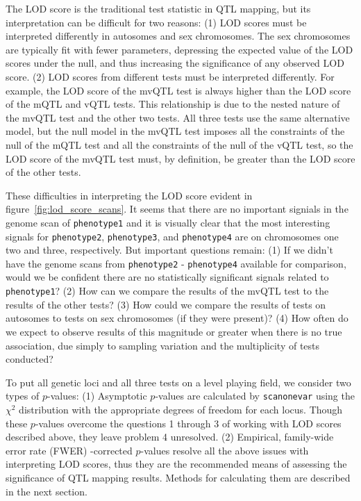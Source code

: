 \documentclass[9pt,twocolumn,twoside]{gsag3jnl}
\begin{document}
The LOD score is the traditional test statistic in QTL mapping, but its interpretation can be difficult for two reasons:
(1) LOD scores must be interpreted differently in autosomes and sex chromosomes.
The sex chromosomes are typically fit with fewer parameters, depressing the expected value of the LOD scores under the null, and thus increasing the significance of any observed LOD score.
(2) LOD scores from different tests must be interpreted differently.
For example, the LOD score of the mvQTL test is always higher than the LOD score of the mQTL and vQTL tests.
This relationship is due to the nested nature of the mvQTL test and the other two tests.
All three tests use the same alternative model, but the null model in the mvQTL test imposes all the constraints of the null of the mQTL test and all the constraints of the null of the vQTL test, so the LOD score of the mvQTL test must, by definition, be greater than the LOD score of the other tests.

These difficulties in interpreting the LOD score evident in figure~\ref{fig:lod_score_scans}.
It seems that there are no important signials in the genome scan of \texttt{phenotype1} and it is visually clear that the most interesting signals for \texttt{phenotype2}, \texttt{phenotype3}, and \texttt{phenotype4} are on chromosomes one two and three, respectively.
But important questions remain:
(1) If we didn't have the genome scans from \texttt{phenotype2} - \texttt{phenotype4} available for comparison, would we be confident there are no statistically significant signals related to \texttt{phenotype1}?
(2) How can we compare the results of the mvQTL test to the results of the other tests?
(3) How could we compare the results of tests on autosomes to tests on sex chromosomes (if they were present)?
(4) How often do we expect to observe results of this magnitude or greater when there is no true association, due simply to sampling variation and the multiplicity of tests conducted?

To put all genetic loci and all three tests on a level playing field, we consider two types of $p$-values:
(1) Asymptotic $p$-values are calculated by \texttt{scanonevar} using the $\chi^2$ distribution with the appropriate degrees of freedom for each locus.
Though these $p$-values overcome the questions 1 through 3 of working with LOD scores described above, they leave problem 4 unresolved.
(2) Empirical, family-wide error rate (FWER) -corrected $p$-values resolve all the above issues with interpreting LOD scores, thus they are the recommended means of assessing the significance of QTL mapping results.
Methods for calculating them are described in the next section.
\end{document}
